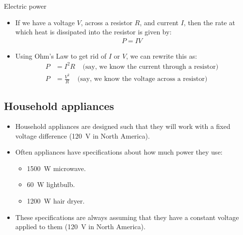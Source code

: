 \documentclass[aspectratio=169,
hyperref={colorlinks,urlcolor=blue}
]{beamer}
\begin{document}
\begin{frame}{Electric power}
\begin{itemize}
\item If we have a voltage $V$, across a resistor $R$, and current $I$, then the rate at which heat is dissipated into the resistor is given by:
\begin{align*}
P= I V
\end{align*}
\item Using Ohm’s Law to get rid of $I$ or $V$, we can rewrite this as:
\begin{align*}
P &= I^2R \;\;\;\;\text{(say, we know the current through a resistor)}\\
P &= \frac{V^2}{R} \;\;\;\;\text{(say, we know the voltage across a resistor)}
\end{align*}
\end{itemize}

\end{frame}



\subsection{Household appliances}
\label{subsec:householdappliances}
{
\begin{itemize}
\item Household appliances are designed such that they will work with a fixed voltage difference (\SI{120}{V} in North America).
\item Often appliances have specifications about how much power they
use:
\begin{itemize}
\item \SI{1500}{W} microwave.
\item \SI{60}{W} lightbulb.
\item \SI{1200}{W} hair dryer.
\end{itemize}
\item[$\rightarrow$]These specifications are always assuming that they have a constant
voltage applied to them (\SI{120}{V} in North America).
\end{itemize}
}
{
\vspace{-1cm}

\vspace{-1cm}
}
\end{document}
